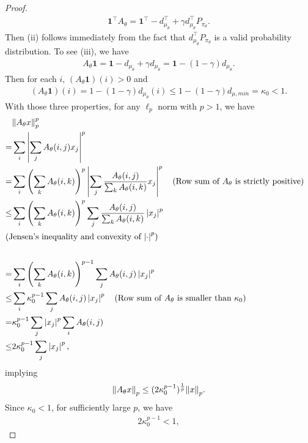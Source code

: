 \documentclass[twoside,11pt]{article}
\newcommand{\tb}[1]{{\textbf{#1}}}
\numberwithin{assucounter}{section}
\begin{document}
\begin{proof}
  \begin{align}
    \tb{1}^\top A_\theta = \tb{1}^\top - d_{\mu_\theta}^\top + \gamma d_{\mu_\theta}^\top P_{\pi_\theta}. 
  \end{align}
  Then (ii) follows immediately from the fact that $d_{\mu_\theta}^\top P_{\pi_\theta}$ is a valid probability distribution.
  To see (iii), we have
  \begin{align}
    A_\theta \tb{1} = \tb{1} - d_{\mu_\theta} + \gamma d_{\mu_\theta} = \tb{1} - (1 - \gamma) d_{\mu_\theta}.
  \end{align}
  Then for each $i$,
  $\left(A_\theta \tb{1}\right)(i) > 0$ and 
  \begin{align}
    \left(A_\theta \tb{1}\right)(i) = 1 - (1-\gamma) d_{\mu_\theta}(i) \leq 1 - (1-\gamma) d_{\mu, min} = \kappa_0 < 1.
  \end{align}
  With those three properties,
  for any $\ell_p$ norm with $p > 1$, we have
  \begin{align}
      &\norm{A_\theta x}_p^p \\
      =& \sum_i \left|\sum_j A_\theta(i, j)x_j\right|^p \\
      =&\sum_i \left(\sum_k A_\theta(i, k)\right)^p \left|\sum_j \frac{A_\theta(i, j)}{\sum_k A_\theta(i, k)}x_j\right|^p \qq{(Row sum of $A_\theta$ is strictly positive)}\\
      \leq& \sum_i \left(\sum_k A_\theta(i, k)\right)^p \sum_j \frac{A_\theta(i, j)}{\sum_k A_\theta(i, k)}\left|x_j\right|^p \\
      \intertext{\hfill (Jensen's inequality and convexity of $\abs{\cdot}^p$)} \\
      =& \sum_i \left(\sum_k A_\theta(i, k)\right)^{p-1} \sum_j {A_\theta(i, j)}\left|x_j\right|^p \\
      \leq& \sum_i \kappa_0^{p-1} \sum_j A_\theta(i, j) \left|x_j\right|^p \qq{(Row sum of $A_\theta$ is smaller than $\kappa_0$)} \\
      =& \kappa_0^{p-1} \sum_j \left|x_j\right|^p \sum_i A_\theta(i, j) \\
      \leq& 2 \kappa_0^{p-1} \sum_j \left|x_j\right|^p,
  \end{align}
  implying
  \begin{align}
      \norm{A_\theta x}_p \leq (2\kappa_0^{p-1})^{\frac{1}{p}} \norm{x}_p.
  \end{align}
  Since $\kappa_0 < 1$,
  for
  sufficiently large $p$, we have
  \begin{align}
    2 \kappa_0^{p-1} < 1,
  \end{align}

\end{proof}
\end{document}
